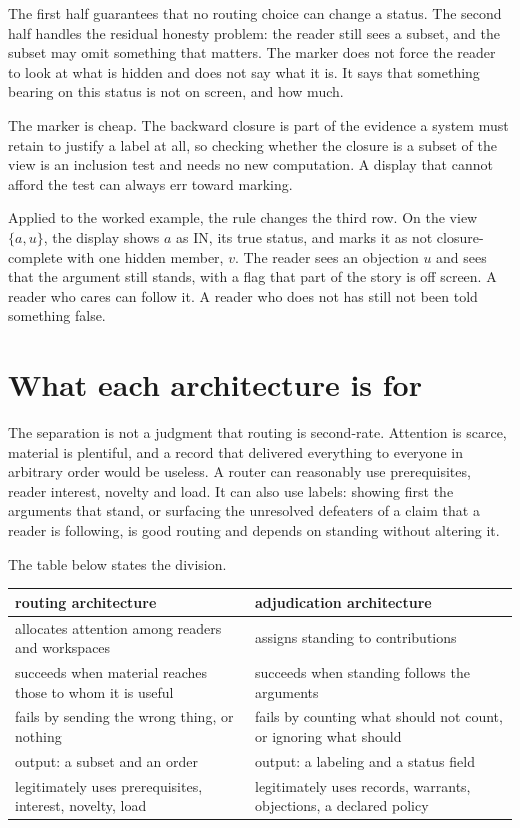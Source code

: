 \documentclass[11pt]{article}
\newcommand{\IN}{\textsf{IN}}
\begin{document}
The first half guarantees that no routing choice can change a status. The second half handles the residual honesty problem: the reader still sees a subset, and the subset may omit something that matters. The marker does not force the reader to look at what is hidden and does not say what it is. It says that something bearing on this status is not on screen, and how much.

The marker is cheap. The backward closure is part of the evidence a system must retain to justify a label at all, so checking whether the closure is a subset of the view is an inclusion test and needs no new computation. A display that cannot afford the test can always err toward marking.

Applied to the worked example, the rule changes the third row. On the view $\{a,u\}$, the display shows $a$ as \IN, its true status, and marks it as not closure-complete with one hidden member, $v$. The reader sees an objection $u$ and sees that the argument still stands, with a flag that part of the story is off screen. A reader who cares can follow it. A reader who does not has still not been told something false.

\section{What each architecture is for}\label{sec:for}

The separation is not a judgment that routing is second-rate. Attention is scarce, material is plentiful, and a record that delivered everything to everyone in arbitrary order would be useless. A router can reasonably use prerequisites, reader interest, novelty and load. It can also use labels: showing first the arguments that stand, or surfacing the unresolved defeaters of a claim that a reader is following, is good routing and depends on standing without altering it.

The table below states the division.

\begin{center}
\small
\begin{tabularx}{\textwidth}{@{}X X@{}}
\toprule
routing architecture & adjudication architecture\\
\midrule
allocates attention among readers and workspaces & assigns standing to contributions\\
succeeds when material reaches those to whom it is useful & succeeds when standing follows the arguments\\
fails by sending the wrong thing, or nothing & fails by counting what should not count, or ignoring what should\\
output: a subset and an order & output: a labeling and a status field\\
legitimately uses prerequisites, interest, novelty, load & legitimately uses records, warrants, objections, a declared policy\\
\bottomrule
\end{tabularx}
\end{center}
\end{document}

